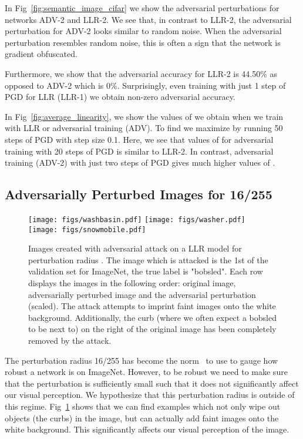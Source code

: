 \documentclass{article}
\theoremstyle{plain}
\theoremstyle{definition}
\theoremstyle{remark}
\begin{document}
In Fig~\ref{fig:semantic_image_cifar} we show the adversarial perturbations for networks ADV-2 and LLR-2. We see that, in contrast to LLR-2, the adversarial perturbation for ADV-2 looks similar to random noise. When the adversarial perturbation resembles random noise, this is often a sign that the network is gradient obfuscated.

Furthermore, we show that the adversarial accuracy for LLR-2 is 44.50\% as opposed to ADV-2 which is 0\%. Surprisingly, even training with just 1 step of PGD for LLR (LLR-1) we obtain non-zero adversarial accuracy.

In Fig~\ref{fig:average_linearity}, we show the values of  we obtain when we train with LLR or adversarial training (ADV). To find  we maximize  by running 50 steps of PGD with step size 0.1. Here, we see that values of  for adversarial training with 20 steps of PGD is similar to LLR-2. In contrast, adversarial training (ADV-2) with just two steps of PGD gives much higher values of .


\subsection{Adversarially Perturbed Images for 16/255}
\begin{figure}[htb]
    \centering
    \texttt{[image: figs/washbasin.pdf]}
    \texttt{[image: figs/washer.pdf]}
    \texttt{[image: figs/snowmobile.pdf]}\caption{Images created with adversarial attack on a LLR model for perturbation radius . The image which is attacked is the 1st of the validation set for ImageNet, the true label is "bobsled". Each row displays the images in the following order: original image, adversarially perturbed image and the adversarial perturbation (scaled). The attack attempts to imprint faint images onto the white background. Additionally, the curb (where we often expect a bobsled to be next to) on the right of the original image has been completely removed by the attack.}
    \label{fig:change_of_visual}
\end{figure}
The perturbation radius 16/255 has become the norm~\citep{kurakin2016adversarial, xie2018feature} to use to gauge how robust a network is on ImageNet. However, to be robust we need to make sure that the perturbation is sufficiently small such that it does not significantly affect our visual perception. We hypothesize that this perturbation radius is outside of this regime. Fig~\ref{fig:change_of_visual} shows that we can find examples which not only wipe out objects (the curbs) in the image, but can actually add faint images onto the white background. This significantly affects our visual perception of the image.



 
\end{document}
